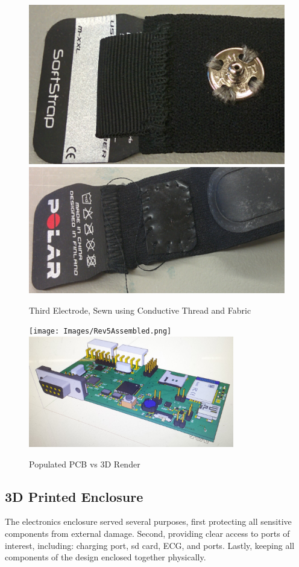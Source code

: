 \begin{figure}[ht]
\begin{center}
	\label{fig:polar_3rdSnap}
	\includegraphics[angle=0,scale=1,width=.51\textwidth]{Images/Polar_top.png} 
	\includegraphics[angle=0,scale=1,width=.51\textwidth]{Images/Polar_bottom.png}
	\caption{Third Electrode, Sewn using Conductive Thread and Fabric}
\end{center}
\end{figure}

 

\begin{figure}[ht]
 \begin{center}
  \label{fig:PCBvsRender}
  \texttt{[image: Images/Rev5Assembled.png]} 
  \includegraphics[scale=1,width=0.8\textwidth]{Images/Rev5_prerender.png} 
  \caption{Populated PCB vs 3D Render}
 
 \end{center}
\end{figure}

\subsection {3D Printed Enclosure}
The electronics enclosure served several purposes, first protecting all sensitive components from external damage. Second, providing clear access to ports of interest, including: charging port, sd card, ECG, and  ports. Lastly, keeping all components of the design enclosed together physically. 

